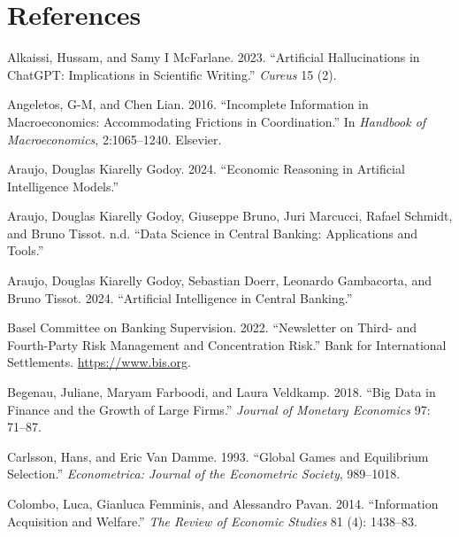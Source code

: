 \documentclass[
]{article}
\newlength{\cslhangindent}
\newenvironment{CSLReferences}[2] %
 {\begin{list}{}{%
  \setlength{\itemindent}{0pt}
  \setlength{\leftmargin}{0pt}
  \setlength{\parsep}{0pt}
  \ifodd #1
   \setlength{\leftmargin}{\cslhangindent}
   \setlength{\itemindent}{-1\cslhangindent}
  \fi
  \setlength{\itemsep}{#2\baselineskip}}}
 {\end{list}}
\theoremstyle{plain}
\theoremstyle{remark}
\begin{document}
\section*{References}\label{references}

\label{refs}
\begin{CSLReferences}{1}{0}
Alkaissi, Hussam, and Samy I McFarlane. 2023. {``Artificial
Hallucinations in ChatGPT: Implications in Scientific Writing.''}
\emph{Cureus} 15 (2).

Angeletos, G-M, and Chen Lian. 2016. {``Incomplete Information in
Macroeconomics: Accommodating Frictions in Coordination.''} In
\emph{Handbook of Macroeconomics}, 2:1065--1240. Elsevier.

Araujo, Douglas Kiarelly Godoy. 2024. {``Economic Reasoning in
Artificial Intelligence Models.''}

Araujo, Douglas Kiarelly Godoy, Giuseppe Bruno, Juri Marcucci, Rafael
Schmidt, and Bruno Tissot. n.d. {``Data Science in Central Banking:
Applications and Tools.''}

Araujo, Douglas Kiarelly Godoy, Sebastian Doerr, Leonardo Gambacorta,
and Bruno Tissot. 2024. {``Artificial Intelligence in Central
Banking.''}

Basel Committee on Banking Supervision. 2022. {``{Newsletter on Third-
and Fourth-Party Risk Management and Concentration Risk}.''} {Bank for
International Settlements}. \url{https://www.bis.org}.

Begenau, Juliane, Maryam Farboodi, and Laura Veldkamp. 2018. {``Big Data
in Finance and the Growth of Large Firms.''} \emph{Journal of Monetary
Economics} 97: 71--87.

Carlsson, Hans, and Eric Van Damme. 1993. {``Global Games and
Equilibrium Selection.''} \emph{Econometrica: Journal of the Econometric
Society}, 989--1018.

Colombo, Luca, Gianluca Femminis, and Alessandro Pavan. 2014.
{``Information Acquisition and Welfare.''} \emph{The Review of Economic
Studies} 81 (4): 1438--83.


\end{CSLReferences}
\end{document}
